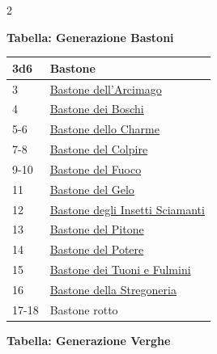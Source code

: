 \begin{multicols}{2}
{\medskip

\textbf{Tabella: Generazione Bastoni}\hypertarget{Bastoni}{}

\medskip

{\small\begin{tabularx}{\linewidth}{ll}
		\toprule
\rowcolor{gray!20}\textbf{3d6} & \textbf{Bastone}\\
\toprule
3 & \hyperlink{Bastone dell'Arcimago}{Bastone dell'Arcimago}\\
\rowcolor{gray!20}4 & \hyperlink{Bastone dei Boschi}{Bastone dei Boschi}\\
5-6 & \hyperlink{Bastone dello Charme}{Bastone dello Charme}\\
\rowcolor{gray!20}7-8 & \hyperlink{Bastone del Colpire}{Bastone del Colpire}\\
9-10 & \hyperlink{Bastone del Fuoco}{Bastone del Fuoco}\\
\rowcolor{gray!20}11 & \hyperlink{Bastone del Gelo}{Bastone del Gelo}\\
12 & \hyperlink{Bastone degli Insetti Sciamanti}{Bastone degli Insetti Sciamanti}\\
\rowcolor{gray!20}13 & \hyperlink{Bastone del Pitone}{Bastone del Pitone}\\
14 & \hyperlink{Bastone del Potere}{Bastone del Potere}\\
\rowcolor{gray!20}15 & \hyperlink{Bastone dei Tuoni e Fulmini}{Bastone dei Tuoni e Fulmini}\\
16 & \hyperlink{Bastone della Stregoneria}{Bastone della Stregoneria}\\
\rowcolor{gray!20}17-18 & Bastone rotto\\
\end{tabularx}}

\medskip

\textbf{Tabella: Generazione Verghe}\hypertarget{Verghe}{}

\medskip

}
\end{multicols}
